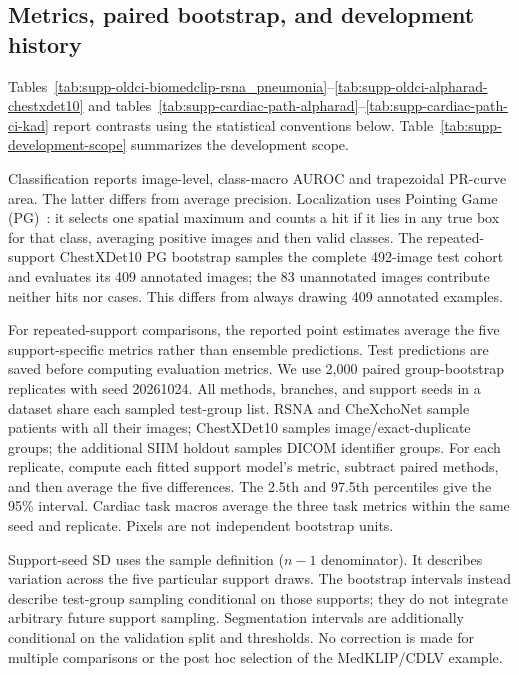 \subsection{Metrics, paired bootstrap, and development history}
\label{supp:statistics}
Tables~\ref{tab:supp-oldci-biomedclip-rsna_pneumonia}--\ref{tab:supp-oldci-alpharad-chestxdet10} and tables~\ref{tab:supp-cardiac-path-alpharad}--\ref{tab:supp-cardiac-path-ci-kad} report contrasts using the statistical conventions below. Table~\ref{tab:supp-development-scope} summarizes the development scope.

Classification reports image-level, class-macro AUROC and trapezoidal PR-curve area. The latter differs from average precision. Localization uses Pointing Game (PG)~\cite{zhang2016pointinggame}: it selects one spatial maximum and counts a hit if it lies in any true box for that class, averaging positive images and then valid classes. The repeated-support ChestXDet10 PG bootstrap samples the complete 492-image test cohort and evaluates its 409 annotated images; the 83 unannotated images contribute neither hits nor cases. This differs from always drawing 409 annotated examples.

For repeated-support comparisons, the reported point estimates average the five support-specific metrics rather than ensemble predictions. Test predictions are saved before computing evaluation metrics. We use 2,000 paired group-bootstrap replicates with seed 20261024. All methods, branches, and support seeds in a dataset share each sampled test-group list. RSNA and CheXchoNet sample patients with all their images; ChestXDet10 samples image/exact-duplicate groups; the additional SIIM holdout samples DICOM identifier groups. For each replicate, compute each fitted support model's metric, subtract paired methods, and then average the five differences. The 2.5th and 97.5th percentiles give the 95\% interval. Cardiac task macros average the three task metrics within the same seed and replicate. Pixels are not independent bootstrap units.

Support-seed SD uses the sample definition ($n-1$ denominator). It describes variation across the five particular support draws. The bootstrap intervals instead describe test-group sampling conditional on those supports; they do not integrate arbitrary future support sampling. Segmentation intervals are additionally conditional on the validation split and thresholds. No correction is made for multiple comparisons or the post hoc selection of the MedKLIP/CDLV example.


